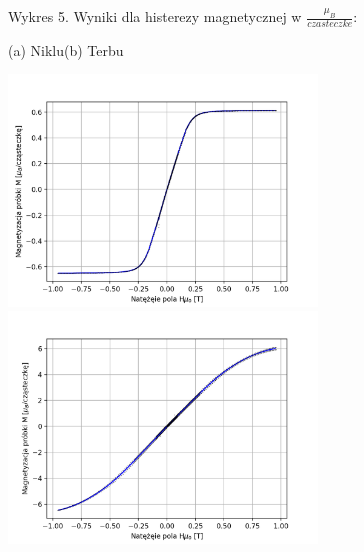 \documentclass[a4paper]{article}
\begin{document}
\begin{figure}[H]
    \centering
    Wykres 5. Wyniki dla histerezy magnetycznej w $\frac{\mu_{B}}{czasteczke}$:
    \vspace{0.6cm}
    
    (a) Niklu\hspace{7cm}(b) Terbu
    
    \includegraphics[width=8.2cm]{Ni_bohr.png}
    \includegraphics[width=8.2cm]{Tb_bohr.png}
    \label{fig:my_label}
\end{figure}
\end{document}
